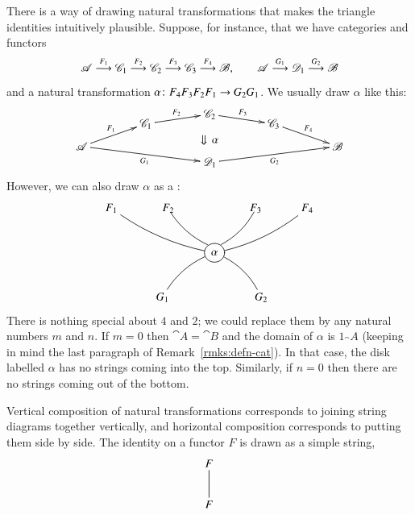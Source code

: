 \begin{remark}
\label{rmk:triangle-string}
There is a way of drawing natural transformations that makes the triangle
identities intuitively plausible.  Suppose, for instance, that we have
categories and functors
\[
\mathscr{A}   \stackrel{F_1}{\longrightarrow}
\mathscr{C}_1 \stackrel{F_2}{\longrightarrow}
\mathscr{C}_2 \stackrel{F_3}{\longrightarrow}
\mathscr{C}_3 \stackrel{F_4}{\longrightarrow}
\mathscr{B},
\qquad
\mathscr{A}   \stackrel{G_1}{\longrightarrow}
\mathscr{D}_1 \stackrel{G_2}{\longrightarrow}
\mathscr{B}
\]
and a natural transformation $\alpha\from F_4 F_3 F_2 F_1 \to G_2 G_1$.  We
usually draw $\alpha$ like this:
\[
\begin{xy}
(-40,5)*+{\cat{A}}="A";
(-20,12)*+{\cat{C}_1}="C1";
(0,15)*+{\cat{C}_2}="C2";
(20,12)*+{\cat{C}_3}="C3";
(40,5)*+{\cat{B}}="B";
(0,0)*+{\cat{D}_1}="D1";
(0,7)*+{\Downarrow\,\alpha};
{\ar^{F_1} "A";"C1"};
{\ar^{F_2} "C1";"C2"};
{\ar^{F_3} "C2";"C3"};
{\ar^{F_4} "C3";"B"};
{\ar_{G_1} "A";"D1"};
{\ar_{G_2} "D1";"B"};
\end{xy}
\]
However, we can also draw $\alpha$ as a :%
%
%
%
\[
\xymatrix{
F_1 \ar@/_/@{-}[drr] &
\hspace{1em}F_2 \ar@/_/@<1ex>@{-}[dr]&
&
\hspace{-1em}F_3 \ar@/^/@<-1ex>@{-}[dl] &
F_4 \ar@/^/@{-}[dll]\\
&&
*+<1pc>[o][F-]{\alpha}\\
&
G_1 \ar@/^/@{-}[ur]&
&
G_2 \ar@/_/@{-}[ul]
}
\]
There is nothing special about $4$ and $2$; we could replace them by any
natural numbers $m$ and $n$.  If $m = 0$ then $\cat{A} = \cat{B}$ and the
domain of $\alpha$ is $1_\cat{A}$ (keeping in mind the last paragraph of
Remark~\ref{rmks:defn-cat}).  In that case, the
disk labelled $\alpha$ has no strings coming into the top.  Similarly, if
$n = 0$ then there are no strings coming out of the bottom.

Vertical composition of natural transformations corresponds to joining
string diagrams together vertically, and horizontal composition corresponds
to put\-ting them side by side.  The identity on a functor $F$ is drawn as a
simple string,
\[
\xymatrix{
F \ar@{-}[d] \\
F}
\]


\end{remark}
